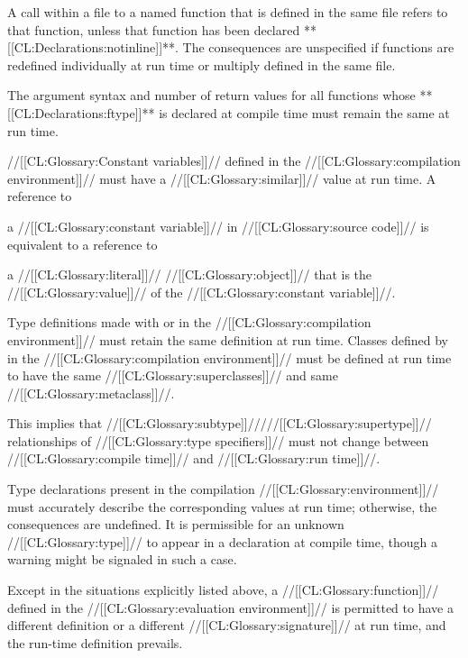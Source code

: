  \itemitem{\bull} A call within a file to a named function that is
defined in the same file refers to that function, unless that function
has been declared **[[CL:Declarations:notinline]]**.  The consequences are unspecified
if functions are redefined individually at run time or multiply
defined in the same file.





  
 \itemitem{\bull} The argument syntax and number of return values for
all functions whose **[[CL:Declarations:ftype]]** is declared at compile time must
remain the same at run time.
 


 \itemitem{\bull} //[[CL:Glossary:Constant variables]]// defined in
the //[[CL:Glossary:compilation environment]]// must have a //[[CL:Glossary:similar]]// value at
run time.  A reference to 

a //[[CL:Glossary:constant variable]]// 
in //[[CL:Glossary:source code]]// is equivalent to a reference to 

a //[[CL:Glossary:literal]]// //[[CL:Glossary:object]]// that is the //[[CL:Glossary:value]]// of the //[[CL:Glossary:constant variable]]//.
 



 \itemitem{\bull} Type definitions made with  or
 in the //[[CL:Glossary:compilation environment]]// must
retain the same definition at run time.  Classes defined by 
in the //[[CL:Glossary:compilation environment]]// must be defined
at run time to have the same //[[CL:Glossary:superclasses]]// and same 
//[[CL:Glossary:metaclass]]//.

This implies that //[[CL:Glossary:subtype]]/////[[CL:Glossary:supertype]]// relationships of 
//[[CL:Glossary:type specifiers]]// must not change between //[[CL:Glossary:compile time]]// and //[[CL:Glossary:run time]]//.  
 

 \itemitem{\bull} Type declarations present in the compilation 
//[[CL:Glossary:environment]]// must accurately describe the corresponding values at run time;
otherwise, the consequences are undefined.  It is permissible
for an unknown //[[CL:Glossary:type]]// to appear in a declaration at 
compile time, though a warning might be signaled in such a case.

 \itemitem{\bull} Except in the situations explicitly listed above, a
//[[CL:Glossary:function]]// defined in the //[[CL:Glossary:evaluation environment]]//
is permitted to have a different definition or a different //[[CL:Glossary:signature]]//
at run time, and the run-time definition prevails.

